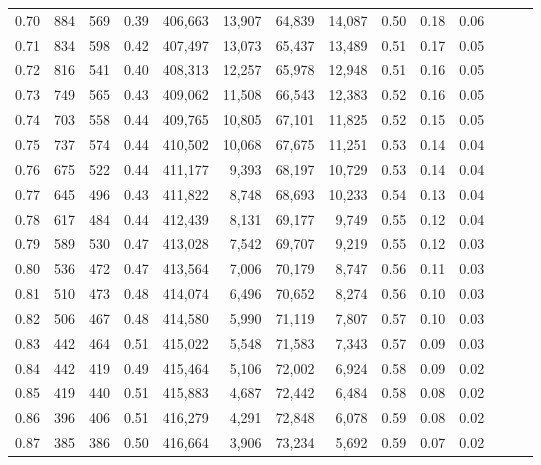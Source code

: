 \begin{tabular}{rrrrrrrrrrrrrr}
0.70 &     884 &    569 &  0.39 &  406,663 &   13,907 &  64,839 &  14,087 &  0.50 &  0.18 &      0.06 \\
0.71 &     834 &    598 &  0.42 &  407,497 &   13,073 &  65,437 &  13,489 &  0.51 &  0.17 &      0.05 \\
0.72 &     816 &    541 &  0.40 &  408,313 &   12,257 &  65,978 &  12,948 &  0.51 &  0.16 &      0.05 \\
0.73 &     749 &    565 &  0.43 &  409,062 &   11,508 &  66,543 &  12,383 &  0.52 &  0.16 &      0.05 \\
0.74 &     703 &    558 &  0.44 &  409,765 &   10,805 &  67,101 &  11,825 &  0.52 &  0.15 &      0.05 \\
0.75 &     737 &    574 &  0.44 &  410,502 &   10,068 &  67,675 &  11,251 &  0.53 &  0.14 &      0.04 \\
0.76 &     675 &    522 &  0.44 &  411,177 &    9,393 &  68,197 &  10,729 &  0.53 &  0.14 &      0.04 \\
0.77 &     645 &    496 &  0.43 &  411,822 &    8,748 &  68,693 &  10,233 &  0.54 &  0.13 &      0.04 \\
0.78 &     617 &    484 &  0.44 &  412,439 &    8,131 &  69,177 &   9,749 &  0.55 &  0.12 &      0.04 \\
0.79 &     589 &    530 &  0.47 &  413,028 &    7,542 &  69,707 &   9,219 &  0.55 &  0.12 &      0.03 \\
0.80 &     536 &    472 &  0.47 &  413,564 &    7,006 &  70,179 &   8,747 &  0.56 &  0.11 &      0.03 \\
0.81 &     510 &    473 &  0.48 &  414,074 &    6,496 &  70,652 &   8,274 &  0.56 &  0.10 &      0.03 \\
0.82 &     506 &    467 &  0.48 &  414,580 &    5,990 &  71,119 &   7,807 &  0.57 &  0.10 &      0.03 \\
0.83 &     442 &    464 &  0.51 &  415,022 &    5,548 &  71,583 &   7,343 &  0.57 &  0.09 &      0.03 \\
0.84 &     442 &    419 &  0.49 &  415,464 &    5,106 &  72,002 &   6,924 &  0.58 &  0.09 &      0.02 \\
0.85 &     419 &    440 &  0.51 &  415,883 &    4,687 &  72,442 &   6,484 &  0.58 &  0.08 &      0.02 \\
0.86 &     396 &    406 &  0.51 &  416,279 &    4,291 &  72,848 &   6,078 &  0.59 &  0.08 &      0.02 \\
0.87 &     385 &    386 &  0.50 &  416,664 &    3,906 &  73,234 &   5,692 &  0.59 &  0.07 &      0.02 \\

\end{tabular}
